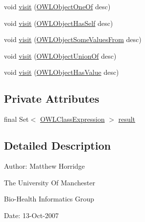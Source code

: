 \begin{DoxyCompactItemize}
\item 
void \hyperlink{classorg_1_1semanticweb_1_1owlapi_1_1normalform_1_1_o_w_l_object_complement_of_extractor_a5cb7503c98530ca0aef05a4fc29c3a13}{visit} (\hyperlink{interfaceorg_1_1semanticweb_1_1owlapi_1_1model_1_1_o_w_l_object_one_of}{O\-W\-L\-Object\-One\-Of} desc)
\item 
void \hyperlink{classorg_1_1semanticweb_1_1owlapi_1_1normalform_1_1_o_w_l_object_complement_of_extractor_a39b21f0a5b50191209422dd78eab464f}{visit} (\hyperlink{interfaceorg_1_1semanticweb_1_1owlapi_1_1model_1_1_o_w_l_object_has_self}{O\-W\-L\-Object\-Has\-Self} desc)
\item 
void \hyperlink{classorg_1_1semanticweb_1_1owlapi_1_1normalform_1_1_o_w_l_object_complement_of_extractor_ae78d2254caa669685c4724f60c34e8de}{visit} (\hyperlink{interfaceorg_1_1semanticweb_1_1owlapi_1_1model_1_1_o_w_l_object_some_values_from}{O\-W\-L\-Object\-Some\-Values\-From} desc)
\item 
void \hyperlink{classorg_1_1semanticweb_1_1owlapi_1_1normalform_1_1_o_w_l_object_complement_of_extractor_ade017cbb7f47cce39ca216c0bfd10dcc}{visit} (\hyperlink{interfaceorg_1_1semanticweb_1_1owlapi_1_1model_1_1_o_w_l_object_union_of}{O\-W\-L\-Object\-Union\-Of} desc)
\item 
void \hyperlink{classorg_1_1semanticweb_1_1owlapi_1_1normalform_1_1_o_w_l_object_complement_of_extractor_ae752b64a99ffdf08d15b1b17528642b3}{visit} (\hyperlink{interfaceorg_1_1semanticweb_1_1owlapi_1_1model_1_1_o_w_l_object_has_value}{O\-W\-L\-Object\-Has\-Value} desc)
\end{DoxyCompactItemize}
\subsection*{Private Attributes}
\begin{DoxyCompactItemize}
\item 
final Set$<$ \hyperlink{interfaceorg_1_1semanticweb_1_1owlapi_1_1model_1_1_o_w_l_class_expression}{O\-W\-L\-Class\-Expression} $>$ \hyperlink{classorg_1_1semanticweb_1_1owlapi_1_1normalform_1_1_o_w_l_object_complement_of_extractor_a2a8312ab75bf933566bac32d6380f183}{result}
\end{DoxyCompactItemize}


\subsection{Detailed Description}
Author\-: Matthew Horridge\par
 The University Of Manchester\par
 Bio-\/\-Health Informatics Group\par
 Date\-: 13-\/\-Oct-\/2007\par
 \par
 

